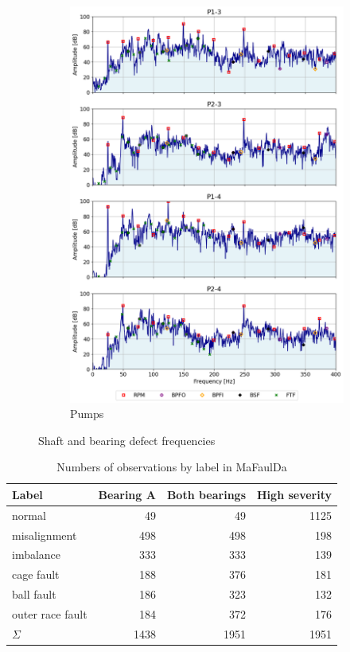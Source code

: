\documentclass{llncs}
\begin{document}
\begin{figure}
\begin{subfigure}[b]{0.3\textwidth}
         \includegraphics[width=\textwidth]{fig/spectrum/pump-fault.png}
         \caption{Pumps}
         \label{fig:pump-fault}
     \end{subfigure}
     \caption{Shaft and bearing defect frequencies}
\end{figure}


\begin{table}
\centering
\caption{Numbers of observations by label in MaFaulDa}\label{tab:mafaulda-observation-counts}
\begin{tabular}{|l|r|r|r|}
\hline
\textbf{Label} &  \textbf{Bearing A} & \textbf{Both bearings} & \textbf{High severity} \\
\hline
normal            &  49  &  49  &  1125 \\
misalignment      & 498  &  498 & 198 \\
imbalance         & 333  &  333 & 139 \\
cage fault        & 188  &  376 & 181 \\
ball fault        & 186  &  323 & 132 \\
outer race fault  & 184  &  372 & 176 \\
\hline
$\Sigma$ & 1438  & 1951 & 1951 \\
\hline
\end{tabular}
\end{table}
\end{document}
